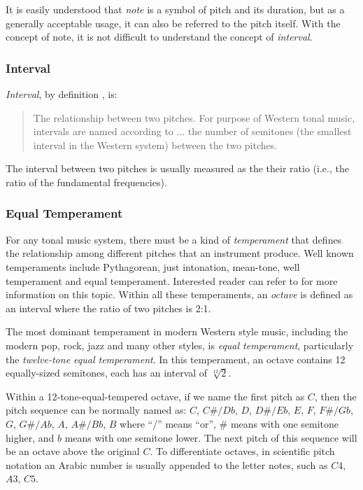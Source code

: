 It is easily understood that {\it note} is a symbol of pitch and its duration, but as a generally acceptable usage, it can also be referred to the pitch itself. With the concept of note, it is not difficult to understand the concept of {\it interval}.

\subsubsection{Interval}
{\it Interval}, by definition \cite{randel1999harvard}, is:
\begin{quote}
The relationship between two pitches. For purpose of Western tonal music, intervals are named according to ... the number of semitones (the smallest interval in the Western system) between the two pitches.
\end{quote}
The interval between two pitches is usually measured as the their ratio (i.e., the ratio of the fundamental frequencies).

\subsubsection{Equal Temperament}
For any tonal music system, there must be a kind of {\it temperament} that defines the relationship among different pitches that an instrument produce. Well known temperaments include Pythagorean, just intonation, mean-tone, well temperament and equal temperament. Interested reader can refer to \cite{barbour2004tuning} for more information on this topic. Within all these temperaments, an {\it octave} is defined as an interval where the ratio of two pitches is 2:1. %

The most dominant temperament in modern Western style music, including the modern pop, rock, jazz and many other styles, is {\it equal temperament}, particularly the {\it twelve-tone equal temperament}. In this temperament, an octave contains 12 equally-sized semitones, each has an interval of $\sqrt[12]{2} $.

Within a 12-tone-equal-tempered octave, if we name the first pitch as $C$, then the pitch sequence can be normally named as:
$C$, $C\#/Db$, $D$, $D\#/Eb$, $E$, $F$, $F\#/Gb$, $G$, $G\#/Ab$, $A$, $A\#/Bb$, $B$
where ``/'' means ``or'', $\#$ means with one semitone higher, and $b$ means with one semitone lower. The next pitch of this sequence will be an octave above the original $C$. To differentiate octaves, in scientific pitch notation \cite{tuningstandard} an Arabic number is usually appended to the letter notes, such as $C4$, $A3$, $C5$.

